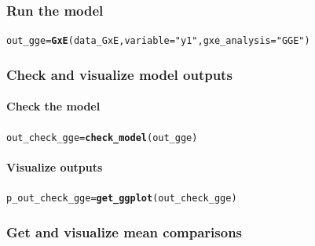 \documentclass{book}\usepackage[]{graphicx}\usepackage[]{color}
\makeatletter
\newcommand{\hlstr}[1]{\textcolor[rgb]{0.192,0.494,0.8}{#1}}%
\newcommand{\hlstd}[1]{\textcolor[rgb]{0.345,0.345,0.345}{#1}}%
\newcommand{\hlkwb}[1]{\textcolor[rgb]{0.69,0.353,0.396}{#1}}%
\newcommand{\hlkwc}[1]{\textcolor[rgb]{0.333,0.667,0.333}{#1}}%
\newcommand{\hlkwd}[1]{\textcolor[rgb]{0.737,0.353,0.396}{\textbf{#1}}}%
\newenvironment{kframe}{%
 \def\at@end@of@kframe{}%
 \ifinner\ifhmode%
  \def\at@end@of@kframe{\end{minipage}}%
  \begin{minipage}{\columnwidth}%
 \fi\fi%
 \def\FrameCommand##1{\hskip\@totalleftmargin \hskip-\fboxsep
 \colorbox{shadecolor}{##1}\hskip-\fboxsep
     \hskip-\linewidth \hskip-\@totalleftmargin \hskip\columnwidth}%
 \MakeFramed {\advance\hsize-\width
   \@totalleftmargin\z@ \linewidth\hsize
   \@setminipage}}%
 {\par\unskip\endMakeFramed%
 \at@end@of@kframe}
\newenvironment{knitrout}{}{} %
\makeatother
\begin{document}
\subsubsection{Run the model}
\begin{knitrout}
\color{fgcolor}\begin{kframe}
\begin{alltt}
\hlstd{out_gge} \hlkwb{=} \hlkwd{GxE}\hlstd{(data_GxE,} \hlkwc{variable} \hlstd{=} \hlstr{"y1"}\hlstd{,} \hlkwc{gxe_analysis} \hlstd{=} \hlstr{"GGE"}\hlstd{)}
\end{alltt}


{\ttfamily\noindent\itshape\color{messagecolor}{\#\# GGE model done for y1}}\end{kframe}
\end{knitrout}

\subsubsection{Check and visualize model outputs}

\paragraph{Check the model}
\begin{knitrout}
\color{fgcolor}\begin{kframe}
\begin{alltt}
\hlstd{out_check_gge} \hlkwb{=} \hlkwd{check_model}\hlstd{(out_gge)}
\end{alltt}
\end{kframe}
\end{knitrout}

\paragraph{Visualize outputs}
\begin{knitrout}
\color{fgcolor}\begin{kframe}
\begin{alltt}
\hlstd{p_out_check_gge} \hlkwb{=} \hlkwd{get_ggplot}\hlstd{(out_check_gge)}
\end{alltt}
\end{kframe}
\end{knitrout}

\subsubsection{Get and visualize mean comparisons}
\end{document}

